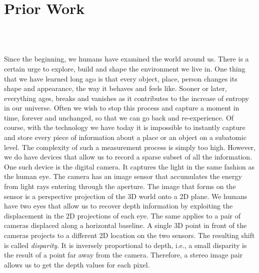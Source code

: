 \chapter{Prior Work}
	
	 \\
	 \\
	
	Since the beginning, we humans have examined the world around us. 
	There is a certain urge to explore, build and shape the environment we live in.
	One thing that we have learned long ago is that every object, place, person changes its shape and appearance, the way it behaves and feels like. Sooner or later, everything ages, breaks and vanishes as it contributes to the increase of entropy in our universe.
	Often we wish to stop this process and capture a moment in time, forever and unchanged, so that we can go back and re-experience.
	Of course, with the technology we have today it is impossible to instantly capture and store every piece of information about a place or an object on a subatomic level.
	The complexity of such a measurement process is simply too high.
	However, we do have devices that allow us to record a sparse subset of all the information.
	One such device is the digital camera.
	It captures the light in the same fashion as the human eye.
	The camera has an image sensor that accumulates the energy from light rays entering through the aperture.
	The image that forms on the sensor is a perspective projection of the 3D world onto a 2D plane.
	We humans have two eyes that allow us to recover depth information by exploiting the displacement in the 2D projections of each eye.
	The same applies to a pair of cameras displaced along a horizontal baseline.
	A single 3D point in front of the cameras projects to a different 2D location on the two sensors.
	The resulting shift is called \emph{disparity}.
	It is inversely proportional to depth, i.e., a small disparity is the result of a point far away from the camera.
	Therefore, a stereo image pair allows us to get the depth values for each pixel.
	
